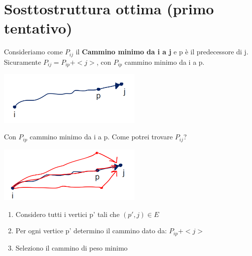 \section{Sosttostruttura ottima (primo tentativo)}
Consideriamo come $P_{ij}$ il \textbf{Cammino minimo da i a j} e p è il predecessore di j.\\
Sicuramente $P_{ij} = P_{ip} + <j>$, con $P_{ip}$ cammino minimo da i a p.
\begin{center}
    \includegraphics[width=70mm, scale=0.5]{chapters_ulerich/img/floyd_warshall_tent_sottostruttura.png}
\end{center}
Con $P_{ip}$ cammino minimo da i a p. Come potrei trovare $P_{ij}$?
\begin{center}
    \includegraphics[width=70mm, scale=0.5]{chapters_ulerich/img/floyd_warshall_tent_sottostruttura_2.png}
\end{center}
\begin{enumerate}
    \item Considero tutti i vertici p' tali che $(p',j) \in E$
    \item Per ogni vertice p' determino il cammino dato da: $P_{ip} + <j>$
    \item Seleziono il cammino di peso minimo
\end{enumerate}
